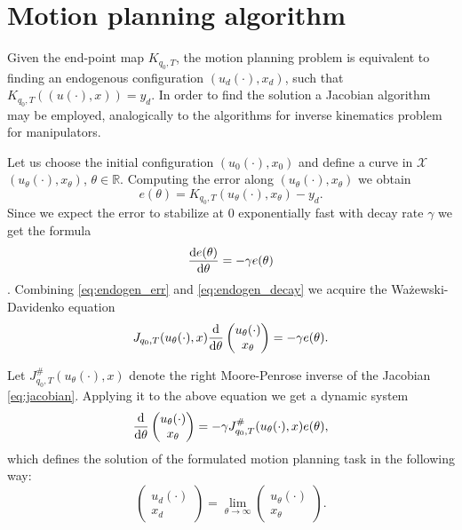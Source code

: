 \section{Motion planning algorithm}
Given the end-point map $K_{q_0, T}$, the motion planning problem is equivalent to finding an endogenous
configuration $(u_d(\cdot), x_d)$, such that $K_{q_0, T}((u(\cdot), x))=y_d$. In order to find the
solution a Jacobian algorithm may be employed, analogically to the algorithms
for inverse kinematics problem for manipulators. 

Let us choose the initial configuration $(u_0(\cdot), x_0)$ and
define a curve in $\mathcal{X}$ $(u_\theta(\cdot), x_\theta)$, $\theta \in \mathbb{R}$.
Computing the error along $(u_\theta(\cdot), x_\theta)$ we obtain
\begin{equation}
\label{eq:endogen_err}
e(\theta)=K_{q_0, T}(u_\theta(\cdot), x_\theta)-y_d.
\end{equation}
Since we expect the error to stabilize at $0$ exponentially fast with decay rate
$\gamma$ we get the formula
\begin{equation}
\label{eq:endogen_decay}
\frac{\mathrm{d} e(\theta)}{\mathrm{d} \theta}=-\gamma e(\theta)
\end{equation}.
Combining \eqref{eq:endogen_err} and \eqref{eq:endogen_decay} we acquire the Ważewski-Davidenko equation
\begin{equation}
J_{q_0, T}(u_\theta(\cdot), x)\dfrac{\mathrm{d}}{\mathrm{d} \theta}\begin{pmatrix}
u_\theta(\cdot)\\ x_\theta
\end{pmatrix}=-\gamma e(\theta).
\end{equation}

Let $J^\#_{q_0, T}(u_\theta(\cdot), x)$ denote the right Moore-Penrose inverse
of the Jacobian \eqref{eq:jacobian}. Applying it to the above equation we get a dynamic system
\begin{equation}
\label{eq:endogen_alg}
\dfrac{\mathrm{d}}{\mathrm{d} \theta}\begin{pmatrix}
u_\theta(\cdot)\\ x_\theta
\end{pmatrix}=-\gamma J^\#_{q_0, T}(u_\theta(\cdot), x) e(\theta),
\end{equation}
which defines the solution of the formulated motion planning task in the following way:
\begin{equation}
\begin{pmatrix}
u_d(\cdot)\\ x_d
\end{pmatrix}=\lim_{\theta\rightarrow\infty}\begin{pmatrix}
u_\theta(\cdot)\\ x_\theta
\end{pmatrix}.
\end{equation}

